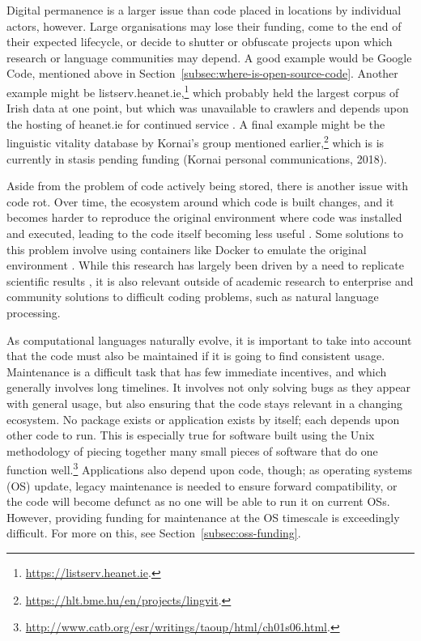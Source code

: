 Digital permanence is a larger issue than code placed in locations by individual actors, however. Large organisations may lose their funding, come to the end of their expected lifecycle, or decide to shutter or obfuscate projects upon which research or language communities may depend. A good example would be Google Code, mentioned above in Section~\ref{subsec:where-is-open-source-code}. Another example might be listserv.heanet.ie,\footnote{\href{https://listserv.heanet.ie}{https://listserv.heanet.ie}. } which probably held the largest corpus of Irish data at one point, but which was unavailable to crawlers and depends upon the hosting of heanet.ie for continued service \citep{scannell2007crubadan}. A final example might be the linguistic vitality database by Kornai's group mentioned earlier,\footnote{\href{https://hlt.bme.hu/en/projects/lingvit}{https://hlt.bme.hu/en/projects/lingvit}. } which is is currently in stasis pending funding (Kornai personal communications, 2018).

Aside from the problem of code actively being stored, there is another issue with code rot. Over time, the ecosystem around which code is built changes, and it becomes harder to reproduce the original environment where code was installed and executed, leading to the code itself becoming less useful \citep{eide2010toward}. Some solutions to this problem involve using containers like Docker to emulate the original environment \citep{boettiger2015introduction}. While this research has largely been driven by a need to replicate scientific results \citep{schwab2000making, barnes2010publish, ince2012case}, it is also relevant outside of academic research to enterprise and community solutions to difficult coding problems, such as natural language processing.

As computational languages naturally evolve, it is important to take into account that the code must also be maintained if it is going to find consistent usage. Maintenance is a difficult task that has few immediate incentives, and which generally involves long timelines. It involves not only solving bugs as they appear with general usage, but also ensuring that the code stays relevant in a changing ecosystem. No package exists or application exists by itself; each depends upon other code to run. This is especially true for software built using the Unix methodology of piecing together many small pieces of software that do one function well.\footnote{\href{http://www.catb.org/esr/writings/taoup/html/ch01s06.html}{http://www.catb.org/esr/writings/taoup/html/ch01s06.html}. } Applications also depend upon code, though; as operating systems (OS) update, legacy maintenance is needed to ensure forward compatibility, or the code will become defunct as no one will be able to run it on current OSs. However, providing funding for maintenance at the OS timescale is exceedingly difficult. For more on this, see Section~\ref{subsec:oss-funding}.

